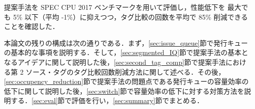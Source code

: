 提案手法を SPEC CPU 2017 ベンチマークを用いて評価し，性能低下を 最大でも 5\% 以下（平均 -1\%）に抑えつつ，タグ比較の回数を平均で 85\% 削減できることを確認した．

本論文の残りの構成は次の通りである．まず，\ref{sec:issue_queue}節で発行キューの基本的な事項を説明する．そして，\ref{sec:segmented_IQ}節で提案手法の基本となるアイデアに関して説明した後，\ref{sec:second_tag_comp}節で提案手法における第 2  ソース・タグのタグ比較回数削減方法に関して述べる．その後，\ref{sec:occupency_reduction}節で提案手法の問題点である発行キューの容量効率の低下に関して説明した後，\ref{sec:switch}節で容量効率の低下に対する対策方法を説明する．\ref{sec:eval}節で評価を行い，\ref{sec:summary}節でまとめる．



